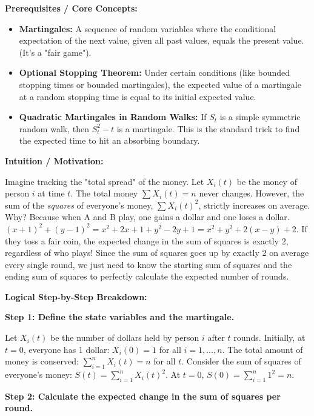 \begin{solution}
\textbf{Prerequisites / Core Concepts:}
\begin{itemize}
    \item \textbf{Martingales:} A sequence of random variables where the conditional expectation of the next value, given all past values, equals the present value. (It's a "fair game").
    \item \textbf{Optional Stopping Theorem:} Under certain conditions (like bounded stopping times or bounded martingales), the expected value of a martingale at a random stopping time is equal to its initial expected value.
    \item \textbf{Quadratic Martingales in Random Walks:} If $S_t$ is a simple symmetric random walk, then $S_t^2 - t$ is a martingale. This is the standard trick to find the expected time to hit an absorbing boundary.
\end{itemize}

\textbf{Intuition / Motivation:}

Imagine tracking the "total spread" of the money. Let $X_i(t)$ be the money of person $i$ at time $t$. The total money $\sum X_i(t) = n$ never changes. However, the sum of the \textit{squares} of everyone's money, $\sum X_i(t)^2$, strictly increases on average. Why? Because when A and B play, one gains a dollar and one loses a dollar. $(x+1)^2 + (y-1)^2 = x^2 + 2x + 1 + y^2 - 2y + 1 = x^2 + y^2 + 2(x-y) + 2$. If they toss a fair coin, the expected change in the sum of squares is exactly 2, regardless of who plays! 
Since the sum of squares goes up by exactly 2 on average every single round, we just need to know the starting sum of squares and the ending sum of squares to perfectly calculate the expected number of rounds.

\textbf{Logical Step-by-Step Breakdown:}

\textbf{Step 1: Define the state variables and the martingale.}

Let $X_i(t)$ be the number of dollars held by person $i$ after $t$ rounds.
Initially, at $t=0$, everyone has 1 dollar: $X_i(0) = 1$ for all $i = 1, \dots, n$.
The total amount of money is conserved: $\sum_{i=1}^n X_i(t) = n$ for all $t$.
Consider the sum of squares of everyone's money: $S(t) = \sum_{i=1}^n X_i(t)^2$.
At $t=0$, $S(0) = \sum_{i=1}^n 1^2 = n$.

\textbf{Step 2: Calculate the expected change in the sum of squares per round.}


\end{solution}
